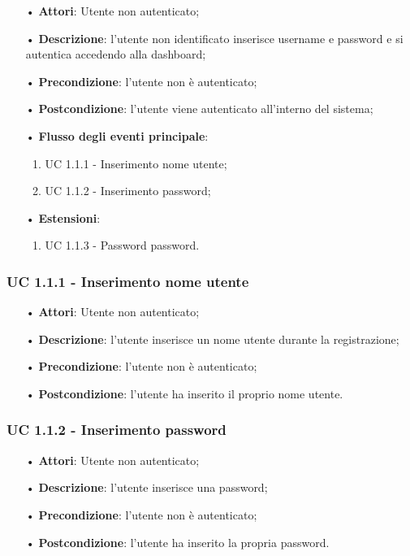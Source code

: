 \begin{itemize}
\item[•]\textbf{Attori}: Utente non autenticato;
\item[•]\textbf{Descrizione}:  l’utente non identificato inserisce username e password e si autentica accedendo alla dashboard;
\item[•]\textbf{Precondizione}: l’utente non è autenticato;
\item[•]\textbf{Postcondizione}: l’utente viene autenticato all’interno del sistema;
\item[•]\textbf{Flusso degli eventi principale}:
\begin{enumerate}
\item UC 1.1.1 - Inserimento nome utente;
\item UC 1.1.2 - Inserimento password;

\end{enumerate}
\item[•]\textbf{Estensioni}:
\begin{enumerate}
\item UC 1.1.3 - Password password.

\end{enumerate}
\end{itemize}

\subsubsection{UC 1.1.1 - Inserimento nome utente}
\begin{itemize}
\item[•]\textbf{Attori}: Utente non autenticato;
\item[•]\textbf{Descrizione}: l’utente inserisce un nome utente durante la registrazione;
\item[•]\textbf{Precondizione}: l’utente non è autenticato;
\item[•]\textbf{Postcondizione}: l’utente ha inserito il proprio nome utente.
\end{itemize}

\subsubsection{UC 1.1.2 - Inserimento password}
\begin{itemize}
\item[•]\textbf{Attori}: Utente non autenticato;
\item[•]\textbf{Descrizione}: l’utente inserisce una password;
\item[•]\textbf{Precondizione}: l'utente non è autenticato;
\item[•]\textbf{Postcondizione}: l'utente ha inserito la propria password.
\end{itemize}
